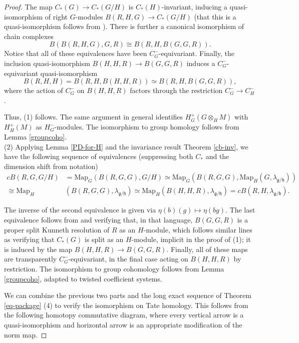 \documentclass{memo-l}
\theoremstyle{definition}
\theoremstyle{remark}
\numberwithin{section}{chapter}
\numberwithin{equation}{chapter}
\begin{document}
\begin{proof}The map $C_*(G) \to C_*(G/H)$ is $C_*(H)$-invariant, inducing a quasi-isomorphism of right $G$-modules $B(R, H, G) \to C_*(G/H)$ (that this is a quasi-isomorphism follows from \cite[Theorem~3.9]{GM}). There is further a canonical isomorphism of chain complexes $$B(B(R,H,G),G,R) \cong B(R,H,B(G,G,R)).$$ Notice that all of these equivalences have been $C^-_G$-equivariant. Finally, the inclusion quasi-isomorphism $B(H,H,R) \to B(G,G,R)$ induces a $C^-_G$-equivariant quasi-isomorphism $$B(R,H,H) = B(R,H,B(H,H,R)) \simeq B(R, H, B(G, G, R)),$$ where the action of $C^-_G$ on $B(H,H,R)$ factors through the restriction $C^-_G \to C^-_H$.

Thus, (1) follows. The same argument in general identifies $H_G^+(G \otimes_H M)$ with $H_H^+(M)$ as $H^-_G$-modules. The isomorphism to group homology follows from Lemma \ref{groupcoho}.\\

\noindent (2) Applying Lemma \ref{PD-for-H} and the invariance result Theorem \ref{cb-inv}, we have the following sequence of equivalences (suppressing both $C_*$ and the dimension shift from notation)
\begin{align*}cB(R, G, G/H) &= \text{Map}_G\left(B(R,G,G), G/H\right) \simeq \text{Map}_G\left(B(R,G,G), \text{Map}_H(G, \lambda_{\mathfrak g/\mathfrak h})\right)\\
\cong \text{Map}_H&(B(R,G,G), \lambda_{\mathfrak g/\mathfrak h}) \simeq \text{Map}_H(B(H,H,R), \lambda_{\mathfrak g/\mathfrak h}) = cB(R,H, \lambda_{\mathfrak g/\mathfrak h}).\end{align*}

The inverse of the second equivalence is given via $\eta(b)(g) \mapsto \eta(bg)$. The last equivalence follows from \cite[Page~11]{GM} and verifying that, in that language, $B(G,G,R)$ is a proper split Kunneth resolution of $R$ as an $H$-module, which follows similar lines as verifying that $C_*(G)$ is split as an $H$-module, implicit in the proof of (1); it is induced by the map $B(H, H, R) \to B(G, G, R)$. Finally, all of these maps are transparently $C^-_G$-equivariant, in the final case acting on $B(H, H, R)$ by restriction. The isomorphism to group cohomology follows from Lemma \ref{groupcoho}, adapted to twisted coefficient systems. 





We can combine the previous two parts and the long exact sequence of Theorem \ref{eq-package} (4) to verify the isomorphism on Tate homology. This follows from the following homotopy commutative diagram, where every vertical arrow is a quasi-isomorphism and horizontal arrow is an appropriate modification of the norm map.


\end{proof}
\end{document}
